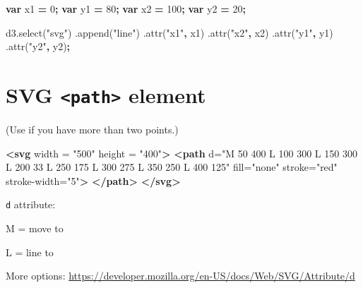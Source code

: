 \documentclass[openany]{book}
\newenvironment{Shaded}{\begin{snugshade}}{\end{snugshade}}
\newcommand{\AttributeTok}[1]{\textcolor[rgb]{0.77,0.63,0.00}{#1}}
\newcommand{\DecValTok}[1]{\textcolor[rgb]{0.00,0.00,0.81}{#1}}
\newcommand{\KeywordTok}[1]{\textcolor[rgb]{0.13,0.29,0.53}{\textbf{#1}}}
\newcommand{\NormalTok}[1]{#1}
\newcommand{\OperatorTok}[1]{\textcolor[rgb]{0.81,0.36,0.00}{\textbf{#1}}}
\newcommand{\OtherTok}[1]{\textcolor[rgb]{0.56,0.35,0.01}{#1}}
\newcommand{\StringTok}[1]{\textcolor[rgb]{0.31,0.60,0.02}{#1}}
\newcommand{\VariableTok}[1]{\textcolor[rgb]{0.00,0.00,0.00}{#1}}
\begin{document}
\begin{Shaded}
\begin{Highlighting}[]
\KeywordTok{var}\NormalTok{ x1 }\OperatorTok{=} \DecValTok{0}\OperatorTok{;}
\KeywordTok{var}\NormalTok{ y1 }\OperatorTok{=} \DecValTok{80}\OperatorTok{;}
\KeywordTok{var}\NormalTok{ x2 }\OperatorTok{=} \DecValTok{100}\OperatorTok{;}
\KeywordTok{var}\NormalTok{ y2 }\OperatorTok{=} \DecValTok{20}\OperatorTok{;}

\VariableTok{d3}\NormalTok{.}\AttributeTok{select}\NormalTok{(}\StringTok{"svg"}\NormalTok{)}
\NormalTok{  .}\AttributeTok{append}\NormalTok{(}\StringTok{"line"}\NormalTok{)}
\NormalTok{  .}\AttributeTok{attr}\NormalTok{(}\StringTok{"x1"}\OperatorTok{,}\NormalTok{ x1)}
\NormalTok{  .}\AttributeTok{attr}\NormalTok{(}\StringTok{"x2"}\OperatorTok{,}\NormalTok{ x2)}
\NormalTok{  .}\AttributeTok{attr}\NormalTok{(}\StringTok{"y1"}\OperatorTok{,}\NormalTok{ y1)}
\NormalTok{  .}\AttributeTok{attr}\NormalTok{(}\StringTok{"y2"}\OperatorTok{,}\NormalTok{ y2)}\OperatorTok{;}
\end{Highlighting}
\end{Shaded}

\hypertarget{svg-path-element}{%
\section{\texorpdfstring{SVG \texttt{\textless{}path\textgreater{}} element}{SVG \textless{}path\textgreater{} element}}\label{svg-path-element}}

(Use if you have more than two points.)

\begin{Shaded}
\begin{Highlighting}[]
\KeywordTok{<svg}\OtherTok{ width} \OtherTok{=} \StringTok{"500"}\OtherTok{ height} \OtherTok{=} \StringTok{"400"}\KeywordTok{>}
  \KeywordTok{<path}\OtherTok{ d=}\StringTok{"M 50 400 L 100 300 L 150 300 L 200 33 L 250 175}
\StringTok{     L 300 275 L 350 250 L 400 125"}\OtherTok{ fill=}\StringTok{"none"}
\OtherTok{      stroke=}\StringTok{"red"}\OtherTok{ stroke-width=}\StringTok{"5"}\KeywordTok{>}
  \KeywordTok{</path>}
\KeywordTok{</svg>}
\end{Highlighting}
\end{Shaded}

\texttt{d} attribute:

M = move to

L = line to

More options: \url{https://developer.mozilla.org/en-US/docs/Web/SVG/Attribute/d}
\end{document}
